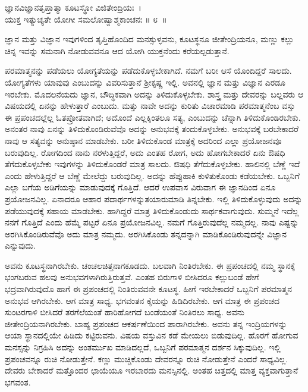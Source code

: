 \begin{shloka}
ಜ್ಞಾನವಿಜ್ಞಾನತೃಪ್ತಾತ್ಮಾ ಕೂಟಸ್ಥೋ ವಿಜಿತೇಂದ್ರಿಯಃ~।\\ಯುಕ್ತ ಇತ್ಯುಚ್ಯತೇ ಯೋಗೀ ಸಮಲೋಷ್ವಾಶ್ಮಕಾಂಚನಃ \hfill॥ ೮~॥
\end{shloka}

\begin{artha}
ಜ್ಞಾನ ಮತ್ತು ವಿಜ್ಞಾನ ಇವುಗಳಿಂದ ತೃಪ್ತಿಹೊಂದಿದ ಮನಸ್ಸುಳ್ಳವನು, ಕೂಟಸ್ಥನೂ ಜೀತೇಂದ್ರಿಯನೂ, ಮಣ್ಣು ಕಲ್ಲು ಚಿನ್ನ ಇವನ್ನು ಸಮನಾಗಿ ನೋಡುವವನೂ ಆದ ಯೋಗಿ ಯುಕ್ತನೆಂದು ಕರೆಯಲ್ಪಡುತ್ತಾನೆ.
\end{artha}

ಪರಮಾತ್ಮನನ್ನು ಪಡೆಯಲು ಯೋಗ್ಯತೆಯನ್ನು ಪಡೆದುಕೊಳ್ಳಬೇಕಾಗಿದೆ. ನಮಗೆ ಬರೀ ಆಸೆ ಯೊಂದಿದ್ದರೆ ಸಾಲದು. ಯೋಗ್ಯತೆಗಳು ಯಾವುವು ಎಂಬುದನ್ನು ವಿವರಿಸುತ್ತಾನೆ ಶ‍್ರೀಕೃಷ್ಣ ಇಲ್ಲಿ. ಅವನಲ್ಲಿ ಜ್ಞಾನ ಮತ್ತು ವಿಜ್ಞಾನ ಎರಡೂ ಇರಬೇಕು. ಮೊದಲನೆಯದು ಜ್ಞಾನ, ಬೌದ್ಧಿಕವಾಗಿ ಅದನ್ನು ತಿಳಿದುಕೊಳ್ಳಬೇಕು. ಶಾಸ್ತ್ರ ಮತ್ತು ದೇವರನ್ನು ಬಲ್ಲವರು ಆ ವಿಷಯದಲ್ಲಿ ಏನನ್ನು ಹೇಳುತ್ತಾರೆ ಎಂಬುದು. ಮತ್ತು ನಾವೇ ಅದನ್ನು ಕುರಿತು ವಿಚಾರಮಾಡಿ ಪರಮಾತ್ಮನೆಂಬ ವಸ್ತು ಈ ಪ್ರಪಂಚದಲ್ಲೆಲ್ಲ ಓತಪ್ರೋತವಾಗಿದೆ; ಅದೊಂದೆ ಎಲ್ಲಕ್ಕಿಂತಲೂ ಸತ್ಯ, ಎಂಬುದನ್ನು ಚೆನ್ನಾಗಿ ತಿಳಿದುಕೊಂಡಿರಬೇಕು. ಅನಂತರ ನಾವು ಏನನ್ನು ತಿಳಿದುಕೊಂಡಿರುವೆವೊ ಅದನ್ನು ಅನುಭವಕ್ಕೆ ತಂದುಕೊಳ್ಳಬೇಕು. ಅನುಭವಕ್ಕೆ ಬರಬೇಕಾದರೆ ನಾವು ಆ ಸತ್ಯವನ್ನು ಅನುಷ್ಠಾನ ಮಾಡಬೇಕು. ಬರೀ ತಿಳಿದುಕೊಂಡ ಮಾತ್ರಕ್ಕೆ ಅದರಿಂದ ಎಲ್ಲಾ ಪ್ರಯೋಜನವೂ ಬರುವುದಿಲ್ಲ. ರೋಗದಿಂದ ನಾನು ನರಳುತ್ತಿದ್ದರೆ, ಅದು ಎಂತಹ ರೋಗ, ಅದು ಹೋಗಬೇಕಾದರೆ ಏನು ಔಷಧಿ ತೆಗೆದುಕೊಳ್ಳಬೇಕು ಇವುಗಳನ್ನು ತಿಳಿದುಕೊಂಡರೆ ಮಾತ್ರ ಸಾಲದು. ಔಷಧಿ ತೆಗೆದುಕೊಳ್ಳಬೇಕು. ಹಾಲಿನಲ್ಲಿ ಬೆಣ್ಣೆ ಇದೆ ಎಂದು ಹೇಳುತ್ತಿದ್ದರೆ ಆ ಬೆಣ್ಣೆ ಮೇಲೆದ್ದು ಬರುವುದಿಲ್ಲ. ಅದನ್ನು ಹೆಪ್ಪುಹಾಕಿ ಕುಳಿತುಕೊಂಡು ಕಡೆಯಬೇಕು. ಒಬ್ಬನಿಗೆ ಎಲ್ಲಾ ಬಗೆಯ ಅಡಿಗೆಯನ್ನು ಮಾಡುವುದಕ್ಕೆ ಗೊತ್ತಿದೆ. ಆದರೆ ಉಪವಾಸ ವಿರುವಾಗ ಈ ಜ್ಞಾನದಿಂದ ಏನೂ ಪ್ರಯೋಜನವಿಲ್ಲ. ಏನಾದರೂ ಆಹಾರ ಪದಾರ್ಥಗಳನ್ನುತಯಾರುಮಾಡಿ ತಿನ್ನಬೇಕು. ಇಲ್ಲಿ ತಿಳಿದುಕೊಳ್ಳುವುದು ಅದನ್ನು ಪಡೆಯುವುದಕ್ಕೆ ಸಹಾಯ ಮಾಡಬೇಕು. ಹಾಗಿದ್ದರೆ ಮಾತ್ರ ತಿಳಿದುಕೊಂಡುದು ಸಾರ್ಥಕವಾಗುವುದು. ಸುಮ್ಮನೆ ಇದೆಲ್ಲ ನನಗೆ ಗೊತ್ತಿದೆ ಎಂದು ಹೆಮ್ಮೆ ಪಟ್ಟರೆ ಏನೂ ಪ್ರಯೋಜನವಿಲ್ಲ. ನಮಗೆ ಗೊತ್ತಿರುವುದೆಲ್ಲ ನಮ್ಮದಲ್ಲ. ನಾವು ಎಷ್ಟನ್ನು ಅರಗಿಸಿಕೊಂಡಿರುವೆವೊ ಅದು ಮಾತ್ರ ನಮ್ಮದು. ಅರಗಿಸಿಕೊಂಡು ತನ್ನದನ್ನಾಗಿ ಮಾಡಿಕೊಂಡಿರುವುದನ್ನೇ ವಿಜ್ಞಾನ ಎನ್ನುವುದು.

ಅವನು ಕೂಟಸ್ಥನಾಗಿರಬೇಕು. ಚಂಚಲಚಿತ್ತನಾಗಕೂಡದು. ಬಲವಾಗಿ ನಿಂತಿರಬೇಕು. ಈ ಪ್ರಪಂಚದಲ್ಲಿ ನಮ್ಮ ಸ್ಥಾನಕ್ಕೆ ಭಂಗಬರುವ ಹಲವು ಅನುಭವಗಳಾಗಿರುತ್ತಿರುತ್ತವೆ. ಎಂತಹ ಬಿರುಗಾಳಿ ಬೀಸಿದರೂ ಕಲ್ಲುಬಂಡೆ ಹೇಗೆ ಭದ್ರವಾಗಿರುವುದೊ ಹಾಗೆ ಈ ಪ್ರಪಂಚದಲ್ಲಿ ನಿಂತಿರು\-ವವನೇ ಕೂಟಸ್ಥ. ಹೀಗೆ ಇರಬೇಕಾದರೆ ಒಬ್ಬನಿಗೆ ಪರಮಾತ್ಮನ ಅನುಭವ ಆಗಿರಬೇಕು. ಆಗ ಮಾತ್ರ ಸಾಧ್ಯ. ಭಗವಂತನ ಕೈಯನ್ನು ಹಿಡಿದಿರಬೇಕು. ಆಗ ಮಾತ್ರ ಈ ಪ್ರಪಂಚದ ಸುಂಟರಗಾಳಿ ಬೀಸಿದರೆ ತರಗೆಲೆಯಂತೆ ಹಾರಿಹೋಗದೆ ಬಂಡೆಯಂತೆ ನಿಂತಿರಲು ಸಾಧ್ಯ. ಅವನು ಜೀತೇಂದ್ರಿಯನಾಗಿರಬೇಕು. ಬಾಹ್ಯ ಪ್ರಪಂಚದ ಆಕರ್ಷಣೆಯಿಂದ ಪಾರಾಗಿರಬೇಕು. ಅವನು ತನ್ನ ಇಂದ್ರಿಯಗಳನ್ನು ಆಯಾ ಸ್ಥಾನದಲ್ಲಿಯೇ ಹಿಡಿದು ಕಟ್ಟಿರುವನು. ವಿಷಯ ವಸ್ತುವಿನ ಕಡೆ ಮೇಯಲು ಬಿಡುವುದಿಲ್ಲ. ಹೊರಗೆ ಹೋಗುವ ಮನಸ್ಸನ್ನು ನಿಗ್ರಹಿಸಿ ಅದನ್ನು ಅಂತರ್ಮುಖ ಮಾಡಿದಲ್ಲದೆ, ಒಬ್ಬನಿಗೆ ಪರಮಾತ್ಮನ ದರ್ಶನ ಸಿಕ್ಕುವುದಿಲ್ಲ. ಇಲ್ಲಿ ಪ್ರಪಂಚವನ್ನೂ ರುಚಿ ನೋಡುತ್ತೇನೆ. ಕಣ್ಣು ಮುಚ್ಚಿಕೊಂಡು ದೇವರನ್ನೂ ರುಚಿ ನೋಡುತ್ತೇನೆ ಎಂದರೆ ಸಾಧ್ಯವಿಲ್ಲ. ದೇವರು ಬೇಕಾದರೆ ಮತ್ತೊಂದರ ಛಾಯೆಯೂ ಇರಬಾರದು ಮನಸ್ಸಿನಲ್ಲಿ. ಅಂತಹ ಚಿತ್ತದಲ್ಲಿ ಮಾತ್ತ ವ್ಯಕ್ತವಾಗುತ್ತಾನೆ ಭಗವಂತ.

